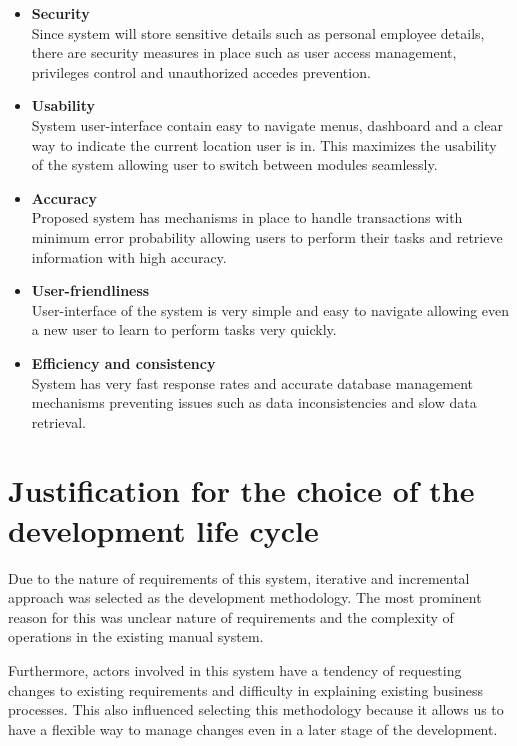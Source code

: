 \documentclass[12pt]{report}
\begin{document}
\begin{itemize}
	\item {\bf{Security}}\\
	      Since system will store sensitive details such as personal employee details, there are security measures in place such as user access management, privileges control and unauthorized accedes prevention.

	\item {\bf{Usability}}\\
	      System user-interface contain easy to navigate menus, dashboard and a clear way to indicate the current location user is in. This maximizes the usability of the system allowing user to switch between modules seamlessly.

	\item {\bf{Accuracy}}\\
	      Proposed system has mechanisms in place to handle transactions with minimum error probability allowing users to perform their tasks and retrieve information with high accuracy.

	\item {\bf{User-friendliness}}\\
	      User-interface of the system is very simple and easy to navigate allowing even a new user to learn to perform tasks very quickly.

	\item {\bf{Efficiency and consistency}}\\
	      System has very fast response rates and accurate database management mechanisms preventing issues such as data inconsistencies and slow data retrieval.
\end{itemize}

\section{Justification for the choice of the development life cycle}
Due to the nature of requirements of this system, iterative and incremental approach was selected as the development methodology. The most prominent reason for this was unclear nature of requirements and the complexity of operations in the existing manual system.

Furthermore, actors involved in this system have a tendency of requesting changes to existing requirements and difficulty in explaining existing business processes. This also influenced selecting this methodology because it allows us to have a flexible way to manage changes even in a later stage of the development.
\end{document}
